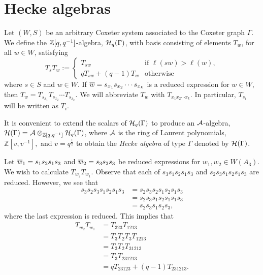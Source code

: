 \section{Hecke algebras}\label{hecke}
Let $(W,S)$ be an arbitrary Coxeter system associated to the Coxeter graph $\Gamma$. We define the $\mathbb{Z}[q,q^{-1}]$-algebra, $\mathcal{H}_q(\Gamma)$, with basis consisting of elements $T_w$, for all $w\in W$, satisfying
\[
T_{s}T_{w}:=\begin{cases}
T_{sw} & \text{if }\ell\left(sw\right)>\ell\left(w\right),\\
qT_{sw}+\left(q-1\right)T_{w} & \text{otherwise}
\end{cases}
\]
where $s\in S$ and $w\in W$. If $\overline{w}=s_{x_1}s_{x_2}\cdots s_{x_k}$ is a reduced expression for $w\in W$, then $T_{w}=T_{s_{x_1}}T_{s_{x_2}}\cdots T_{s_{x_k}}$. We will abbreviate $T_{w}$ with $T_{x_1x_2\cdots x_k}$. In particular, $T_{s_i}$ will be written as $T_i$.

\medskip
It is convenient to extend the scalars of $\mathcal{H}_q(\Gamma)$ to produce an $\mathcal{A}$-algebra, $\mathcal{H}(\Gamma)=\mathcal{A} \otimes_{\mathbb{Z}[q,q^{-1}]}\mathcal{H}_q(\Gamma)$, where $\mathcal{A}$ is the ring of Laurent polynomials, $\mathbb{Z}\left[v,v^{-1}\right],$ and $v=q^{\frac{1}{2}}$ to obtain the \emph{Hecke algebra} of type $\Gamma$ denoted by $\mathcal{H}(\Gamma)$.



\begin{example}
Let $\overline{w}_{1} =s_{1}s_{2}s_{1}s_{3}$ and $\overline{w}_{2} = s_{3}s_{2}s_{3}$ be reduced expressions for $w_1,w_2\in W(A_3)$. We wish to calculate $T_{w_2}T_{w_1}$. Observe that each of $s_3s_1s_2s_1s_3$ and $s_2s_3s_1s_2s_1s_3$ are reduced. However, we see that 
\begin{align*}
s_3s_2s_3s_1s_2s_1s_3&=s_2s_3s_2s_1s_2s_1s_3\\
&=s_2s_3s_1s_2s_1s_1s_3\\
&=s_2s_3s_1s_2s_3,
\end{align*} where the last expression is reduced. This implies that
\begin{align*}
T_{w_{2}}T_{w_{1}}&=  T_{{3}{2}{3}}T_{{1}{2}{1}{3}}\\
&=  T_{{3}}T_{{2}}T_{{3}}T_{{1}{2}{1}{3}}\\
&=  T_{{3}}T_{{2}}T_{{3}{1}{2}{1}{3}} \\
&=  T_{{3}}T_{{2}{3}{1}{2}{1}{3}}\\
&=  qT_{{2}{3}{1}{2}{3}}+\left(q-1\right)T_{{2}{3}{1}{2}{1}{3}}.
\end{align*}
\end{example}

